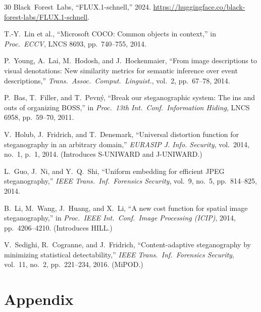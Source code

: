 \documentclass[10pt,twocolumn,a4paper]{article}
\renewcommand{\thesection}{\Roman{section}}
\renewcommand{\thesection}{\arabic{section}}
\begin{document}
\begin{thebibliography}{30}
Black~Forest~Labs,
``FLUX.1-schnell,''
2024.
\url{https://huggingface.co/black-forest-labs/FLUX.1-schnell}.

T.-Y.~Lin et al.,
``Microsoft COCO: Common objects in context,''
in \textit{Proc.\ ECCV}, LNCS 8693, pp.~740--755, 2014.

P.~Young, A.~Lai, M.~Hodosh, and J.~Hockenmaier,
``From image descriptions to visual denotations: New similarity metrics for semantic inference over event descriptions,''
\textit{Trans.\ Assoc.\ Comput.\ Linguist.}, vol.~2, pp.~67--78, 2014.

P.~Bas, T.~Filler, and T.~Pevn\'{y},
``Break our steganographic system: The ins and outs of organizing BOSS,''
in \textit{Proc.\ 13th Int.\ Conf.\ Information Hiding}, LNCS 6958, pp.~59--70, 2011.

V.~Holub, J.~Fridrich, and T.~Denemark,
``Universal distortion function for steganography in an arbitrary domain,''
\textit{EURASIP J. Info. Security}, vol.~2014, no.~1, p.~1, 2014.
(Introduces S-UNIWARD and J-UNIWARD.)

L.~Guo, J.~Ni, and Y.~Q.~Shi,
``Uniform embedding for efficient JPEG steganography,''
\textit{IEEE Trans.\ Inf.\ Forensics Security}, vol.~9, no.~5, pp.~814--825, 2014.

B.~Li, M.~Wang, J.~Huang, and X.~Li,
``A new cost function for spatial image steganography,''
in \textit{Proc.\ IEEE Int.\ Conf.\ Image Processing (ICIP)}, 2014, pp.~4206--4210.
(Introduces HILL.)

V.~Sedighi, R.~Cogranne, and J.~Fridrich,
``Content-adaptive steganography by minimizing statistical detectability,''
\textit{IEEE Trans.\ Inf.\ Forensics Security}, vol.~11, no.~2, pp.~221--234, 2016.
(MiPOD.)

\end{thebibliography}

\onecolumn
\appendix
\section*{Appendix}
\makeatletter
\renewcommand{\addcontentsline}[3]{}
\makeatother
\renewcommand{\thesection}{\Alph{section}}
\setcounter{section}{0}
\end{document}
